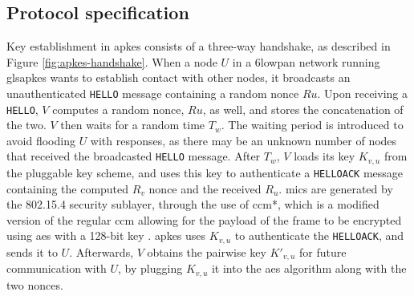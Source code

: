 


\subsection{Protocol specification}

Key establishment in \gls{apkes} consists of a three-way handshake, as described in Figure \ref{fig:apkes-handshake}. When a node $U$ in a \gls{6lowpan} network running gls{apkes} wants to establish contact with other nodes, it broadcasts an unauthenticated \texttt{HELLO} message containing a random nonce $Ru$. Upon receiving a \texttt{HELLO}, $V$ computes a random nonce, $Ru$, as well, and stores the concatenation of the two. $V$ then waits for a random time $T_w$. The waiting period is introduced to avoid flooding $U$ with responses, as there may be an unknown number of nodes that received the broadcasted \texttt{HELLO} message. After $T_w$, $V$ loads its key $K_{v,u}$ from the pluggable key scheme, and uses this key to authenticate a \texttt{HELLOACK} message containing the computed $R_v$ nonce and the received $R_u$. \gls{mic}s are generated by the 802.15.4 security sublayer, through the use of \gls{ccm}*, which is a modified version of the regular \gls{ccm} allowing for the payload of the frame to be encrypted using \gls{aes} with a 128-bit key \cite{krentz20136lowpan}. \gls{apkes} uses $K_{v,u}$ to authenticate the \texttt{HELLOACK}, and sends it to $U$. Afterwards, $V$ obtains the pairwise key $K'_{v,u}$ for future communication with $U$, by plugging $K_{v,u}$ it into the \gls{aes} algorithm along with the two nonces.


